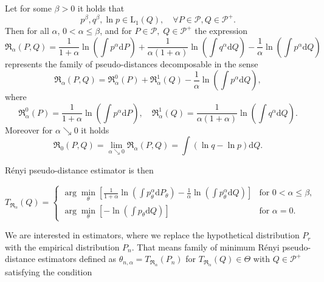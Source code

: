 {\begin{theorem}
Let for some $\beta>0$ it holds that
	\begin{equation*}
			p^\beta, q^\beta,\ln{p} \in \mathrm{L}_1(Q), \quad \forall P \in \mathcal{P}, Q \in \mathcal{P^+}.
	\end{equation*}
	Then for all $\alpha$, $0 < \alpha \leq \beta$, and for $P \in \mathcal{P}, \; Q \in \mathcal{P^+} $ the expression 
	\begin{equation}
		\mathfrak{R}_\alpha (P,Q) = \dfrac{1}{1+\alpha}\ln{\left( \int{p^\alpha \mathrm{d}P } \right)} +
		\dfrac{1}{\alpha (1+\alpha)}\ln{\left( \int{q^\alpha \mathrm{d}Q } \right)} -
		\dfrac{1}{\alpha} \ln{\left( \int{p^\alpha \mathrm{d}Q } \right)}
	\end{equation}
		represents the family of pseudo-distances decomposable in the sense
	\begin{equation*}
		\mathfrak{R}_\alpha (P,Q) = \mathfrak{R}_\alpha^0 (P) + \mathfrak{R}_\alpha^1 (Q) - \dfrac{1}{\alpha} \ln{\left( \int{p^\alpha \mathrm{d}Q } \right)},
	\end{equation*}	
	where 
	\begin{equation*}
		\mathfrak{R}_\alpha^0 (P) = \dfrac{1}{1+\alpha}\ln{\left( \int{p^\alpha \mathrm{d}P } \right)}, \quad \mathfrak{R}_\alpha^1 (Q) = \dfrac{1}{\alpha (1+\alpha)}\ln{\left( \int{q^\alpha \mathrm{d}Q } \right)}.
	\end{equation*}
	Moreover for $\alpha \searrow 0$ it holds
	\begin{equation*}
		\mathfrak{R}_0 (P,Q) = \lim_{\alpha \searrow 0} \mathfrak{R}_\alpha (P,Q) =  \int{\left( \ln{q} - \ln{p} \right)\mathrm{d}Q}.
	\end{equation*}
\end{theorem}

R\'{e}nyi pseudo-distance estimator is then 

\begin{equation}
	T_{\mathfrak{R}_\alpha}(Q) = 
	\begin{cases}
		 \arg \min_{\theta} \left[\frac{1}{1+\alpha} \ln(\int p_\theta^\alpha\mathrm{d}P_\theta) - \frac{1}{\alpha} \ln(\int p_\theta^\alpha\mathrm{d}Q) \right] & \text{for } 0 < \alpha \leq \beta, \\
		 \arg \min_{\theta} \left[- \ln(\int p_\theta\mathrm{d}Q) \right] & \text{for } \alpha = 0.
	\end{cases}	
\end{equation}

We are interested in estimators, where we replace the hypothetical distribution $P_r$ with the empirical distribution $P_n$. That means family of minimum R\'{e}nyi pseudo-distance estimators defined as $\theta_{n,\alpha} = T_{\mathfrak{R}_\alpha}(P_n)$ for $T_{\mathfrak{R}_\alpha}(Q) \in \Theta$ with $Q \in \mathcal{P}^+$ satisfying the condition

}
